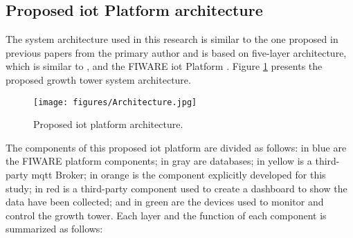 \documentclass[preprint, review, 12pt]{elsarticle}
\begin{document}
\subsection{Proposed \gls{iot} Platform architecture}
\label{sec:iotPlatform}

The system architecture used in this research is similar to the one proposed in previous papers from the primary author \cite{alves2019, gomesalves2022, alves2023} and is based on five-layer architecture, which is similar to \cite{kamienski2019}, and the FIWARE \gls{iot} Platform \cite{FIWARE2021}. Figure \ref{fig:architecture} presents the proposed growth tower system architecture. 

\begin{figure}[htbp]
    \centering
    \texttt{[image: figures/Architecture.jpg]}
    \caption{Proposed \gls{iot} platform architecture.}
    \label{fig:architecture}
\end{figure}

The components of this proposed \gls{iot} platform are divided as follows: in blue are the FIWARE platform components; in gray are databases; in yellow is a third-party \gls{mqtt} Broker; in orange is the component explicitly developed for this study; in red is a third-party component used to create a dashboard to show the data have been collected; and in green are the devices used to monitor and control the growth tower. Each layer and the function of each component is summarized as follows:
\end{document}
